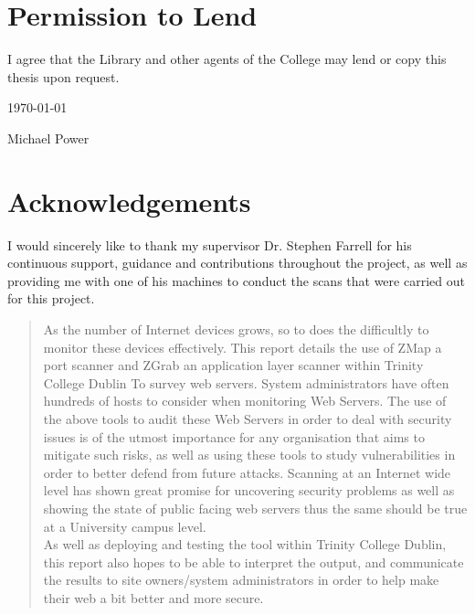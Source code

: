 \documentclass[a4wide,leqno,12pt]{report}
\begin{document}
\chapter*{Permission to Lend}

I agree that the Library and other agents of
the College may lend or copy this thesis upon request.

\begin{center}
\vspace*{2in}

\underline{\hspace*{3in}} \today

Michael Power


\end{center}


\chapter*{Acknowledgements}
I would sincerely like to thank my supervisor Dr. Stephen Farrell for his continuous support, guidance and contributions  throughout the project, as well as providing me with one of his machines to conduct the scans that were carried out for this project. 

\newpage



\tableofcontents
\listoffigures
\listoftables


\begin{abstract}
\noindent
As the number of Internet devices grows, so to does the difficultly to monitor these devices effectively. This report details the use of ZMap a port scanner and ZGrab an application layer scanner within Trinity College Dublin To survey web servers. System administrators have often hundreds of hosts to consider when monitoring Web Servers. The use of the above tools to audit these Web Servers in order to deal with security issues is of the utmost importance for any organisation that aims to mitigate such risks, as well as using these tools to study vulnerabilities in order to better defend from future attacks. Scanning at an Internet wide level has shown great promise for uncovering security problems as well as showing the state of public facing web servers \cite{durumeric2015search} thus the same should be true at a University campus level.\\

As well as deploying and testing the tool within Trinity College Dublin, this report also hopes to be able to interpret the output, and communicate the results to site owners/system administrators in order to help make their web a bit better and more secure.

\end{abstract}
\end{document}
